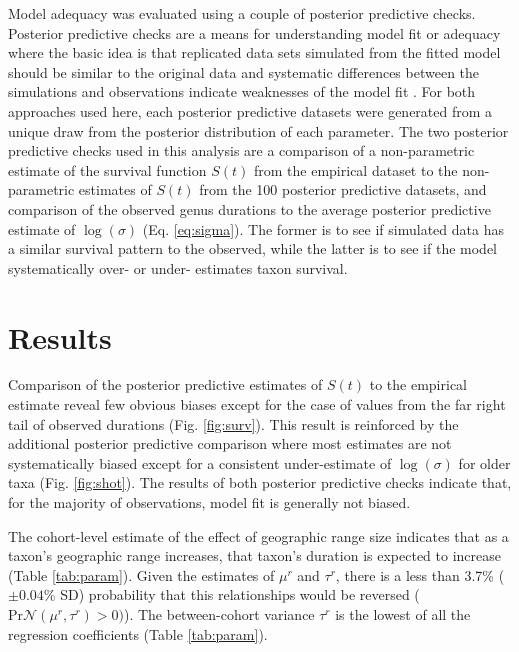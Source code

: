 \documentclass[11pt]{article}
\begin{document}
Model adequacy was evaluated using a couple of posterior predictive checks. Posterior predictive checks are a means for understanding model fit or adequacy where the basic idea is that replicated data sets simulated from the fitted model should be similar to the original data and systematic differences between the simulations and observations indicate weaknesses of the model fit \citep{Gelman2013d}. For both approaches used here, each posterior predictive datasets were generated from a unique draw from the posterior distribution of each parameter. The two posterior predictive checks used in this analysis are a comparison of a non-parametric estimate of the survival function \(S(t)\) from the empirical dataset to the non-parametric estimates of \(S(t)\) from the 100 posterior predictive datasets, and comparison of the observed genus durations to the average posterior predictive estimate of \(\log(\sigma)\) (Eq. \ref{eq:sigma}). The former is to see if simulated data has a similar survival pattern to the observed, while the latter is to see if the model systematically over- or under- estimates taxon survival.







\section*{Results}

Comparison of the posterior predictive estimates of \(S(t)\) to the empirical estimate reveal few obvious biases except for the case of values from the far right tail of observed durations (Fig. \ref{fig:surv}). This result is reinforced by the additional posterior predictive comparison where most estimates are not systematically biased except for a consistent under-estimate of \(\log(\sigma)\) for older taxa (Fig. \ref{fig:shot}). The results of both posterior predictive checks indicate that, for the majority of observations, model fit is generally not biased.

The cohort-level estimate of the effect of geographic range size indicates that as a taxon's geographic range increases, that taxon's duration is expected to increase (Table \ref{tab:param}). Given the estimates of \(\mu^{r}\) and \(\tau^{r}\), there is a less than 3.7\% (\(\pm 0.04\%\) SD) probability that this relationships would be reversed (\(\mathrm{Pr}\mathcal{N}(\mu^{r}, \tau^{r}) > 0)\)). The between-cohort variance \(\tau^{r}\) is the lowest of all the regression coefficients (Table \ref{tab:param}).
\end{document}
